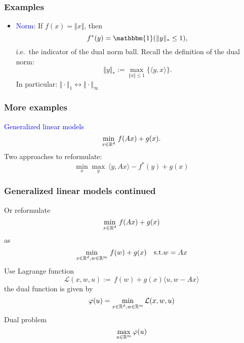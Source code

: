 \documentclass[aspectratio=149]{beamer}
\begin{document}
\begin{frame}
  \frametitle{Examples}
  \begin{itemize}
    \item \textcolor{blue}{Norm:} If $f(x) = \Vert x \Vert$, then
          \begin{equation}
            f^*(y) = \mathbbm{1}(\Vert y \Vert_* \le 1),
          \end{equation}
          i.e.\ the indicator of the dual norm ball.
          Recall the definition of the dual norm:
          \begin{equation}
            \Vert y \Vert_* :=  \max_{\Vert x \Vert \le 1} \{\langle y, x \rangle\}.
          \end{equation}
          In particular: $\Vert \cdot \Vert_1 \leftrightarrow \Vert \cdot \Vert_\infty$
  \end{itemize}
\end{frame}

\begin{frame}
  \frametitle{More examples}
    \textcolor{blue}{Generalized linear models}
    \begin{equation}
      \min_{x\in \mathbb{R}^d} \, f(Ax) + g(x).
    \end{equation}
    Two approaches to reformulate:
    \begin{equation}
      \min_x \max_y \, \langle y, Ax \rangle - f^*(y) + g(x)
    \end{equation}
\end{frame}

\begin{frame}
  \frametitle{Generalized linear models continued}
  Or reformulate
    \begin{equation}
      \min_{x\in \mathbb{R}^d} \, f(Ax) + g(x)
    \end{equation}
    as
    \begin{equation}
      \min_{x\in\mathbb{R}^d, w\in \mathbb{R}^m} \, f(w)+ g(x) \quad \text{s.t.} w = Ax
    \end{equation}
    Use Lagrange function
    \begin{equation}
      \mathcal{L}(x,w, u) :=  \, f(w)+ g(x) \langle u, w - Ax \rangle
    \end{equation}
    the dual function is given by
    \begin{equation}
      \varphi(u) = \min_{x\in\mathbb{R}^d, w\in \mathbb{R}^m} \mathcal{L}(x,w,u)
    \end{equation}
    Dual problem
    \begin{equation}
      \max_{u \in \mathbb{R}^m} \varphi(u)
    \end{equation}

\end{frame}
\end{document}
